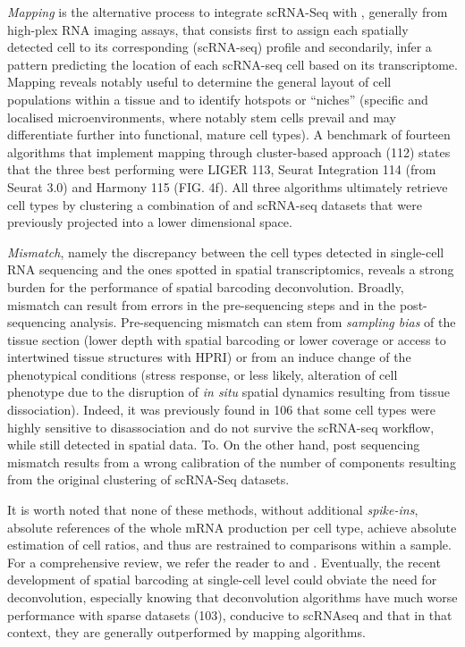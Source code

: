 \textit{Mapping} is the alternative process to integrate scRNA-Seq with , generally from high-plex RNA imaging assays, that consists first to assign each spatially detected cell to its corresponding (scRNA-seq) profile and secondarily, infer a pattern predicting the location of each scRNA-seq cell based on its transcriptome. Mapping reveals notably useful to determine the general layout of cell populations within a tissue and to identify hotspots or \enquote{niches} (specific and localised microenvironments, where notably stem cells prevail and may differentiate further into functional, mature cell types). A benchmark of fourteen algorithms that implement mapping through cluster-based approach (112) states that the three best performing were LIGER 113, Seurat Integration 114 (from Seurat 3.0) and Harmony 115 (FIG. 4f). All three algorithms ultimately retrieve cell types by clustering a combination of  and scRNA-seq datasets that were previously projected into a lower dimensional space. 


\textit{Mismatch}, namely the discrepancy between the cell types detected in single-cell RNA sequencing and the ones spotted in spatial transcriptomics, reveals a strong burden for the performance of spatial barcoding deconvolution. Broadly, mismatch can result from errors in the pre-sequencing steps and in the post-sequencing analysis. Pre-sequencing mismatch can stem from \textit{sampling bias} of the tissue section (lower depth with spatial barcoding or lower coverage or access to intertwined tissue structures with HPRI) or from an induce change of the phenotypical conditions (stress response, or less likely, alteration of cell phenotype due to the disruption of \textit{in situ} spatial dynamics resulting from tissue dissociation). Indeed, it was previously found in 106 that some cell types were highly sensitive to disassociation and do not survive the scRNA-seq workflow, while still detected in spatial data. To. On the other hand, post sequencing mismatch results from a wrong calibration of the number of components resulting from the original clustering of scRNA-Seq datasets. 


It is worth noted that none of these methods, without additional \textit{spike-ins}, absolute references of the whole mRNA production per cell type, achieve absolute estimation of cell ratios, and thus are restrained to comparisons within a sample. For a comprehensive review, we refer the reader to \autocite{rao_etal21} and \autocite[Table 3]{longo_etal21}. Eventually, the recent development of spatial barcoding at single-cell level  could obviate the need for deconvolution, especially knowing that deconvolution algorithms have much worse performance with sparse datasets (103), conducive to scRNAseq and that in that context, they are generally outperformed by mapping algorithms. 

